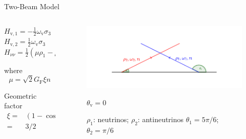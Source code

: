 \begin{frame}{Two-Beam Model}

\begin{columns}[T]

\begin{column}{0.3\textwidth}

$H_{\mathrm v,1} = - \frac{1}{2}\omega_{\mathrm v} \sigma_3 $\\
$H_{\mathrm v,2} =  \frac{1}{2}\omega_{\mathrm v} \sigma_3 $\\
$H_{\nu\nu} = \frac{1}{2} (\mu\rho_1- \mu\rho_2)$


where
\begin{equation*}
   \mu = \sqrt{2} G_{\mathrm F} \xi n
\end{equation*}

Geometric factor
\begin{align*}
\xi =& (1-\cos(\theta_1-\theta_2)) \\
=& 3/2%
\end{align*}



\end{column}

\begin{column}{0.7\textwidth}
\begin{figure}
   \includegraphics[width=\textwidth]{assets/two-beams-model-sym}
   \caption*{$\rho_1$: neutrinos; $\rho_2$: antineutrinos
   $\theta_1= 5\pi/6$; $\theta_2 = \pi/6$}
   $\theta_{\mathrm v}=0$
\end{figure}

%

\end{column}


\end{columns}


\end{frame}


